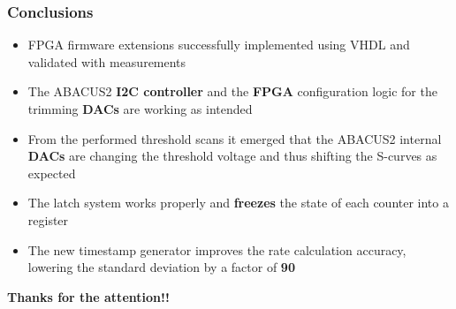 \documentclass[aspectratio=169]{beamer}
\begin{document}
	\begin{frame}
	\frametitle{Conclusions}
		\begin{itemize}
			\item FPGA firmware extensions successfully implemented using VHDL and validated with measurements
			\item The ABACUS2 \textbf{I2C controller} and the \textbf{FPGA} configuration
			logic for the trimming \textbf{DACs} are working as intended
			\item From the performed threshold scans it emerged that the ABACUS2
			internal \textbf{DACs} are changing the threshold voltage and thus
			shifting the S-curves as expected
			\item The latch system works properly and \textbf{freezes} the state
			of each counter into a register
			\item The new timestamp generator improves the rate
			calculation accuracy, lowering the standard deviation by a factor of \textbf{90}
		\end{itemize}
			\vspace{0.8 cm}
		\begin{center}
			\textbf{Thanks for the attention!!}
		\end{center}	
	\end{frame}
\end{document}
